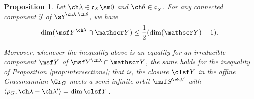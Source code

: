 \documentclass[final]{amsart}
\newtheorem{prop}[subsubsection]{Proposition}
\theoremstyle{remark}
\theoremstyle{definition}
\numberwithin{equation}{section}
\begin{document}
\begin{prop} \label{prop:centralstrata} 
Let $\ch\lambda \in \mathfrak c_X \sm 0$ and 
$\ch\theta \in \mathfrak c_X^-$. 
For any connected component $\mathscr Y$ of 
$\sY^{\ch\lambda,\ch\theta}$, 
we have
\begin{equation} \label{e:semismall-ineq}
    \dim ( \msf Y^{\ch\lambda} \cap \mathscr Y ) 
    \le \frac 1 2 ( \dim (\mathscr Y) - 1 ). 
\end{equation}

Moreover, whenever the inequality above is an equality for an irreducible component $\msf Y$ of $\msf Y^{\ch\lambda} \cap \mathscr Y$, the same holds for the inequality of Proposition \ref{prop:intersections}; that is, the closure $\olsf Y$ in the affine Grassmannian $\Gr_G$ meets a semi-infinite orbit $\msf S^{\ch\lambda'}$ with $\left< \rho_G, \ch\lambda-\ch\lambda'\right> = \dim \olsf Y$.
\end{prop}
\end{document}
